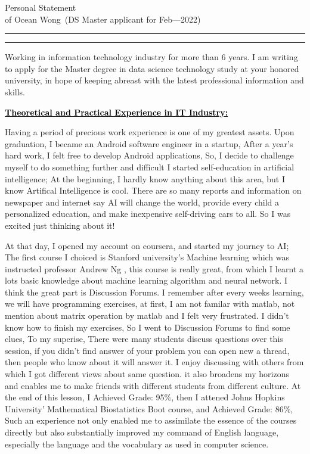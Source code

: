 \documentclass{article}
\newcommand{\soptitle}{Personal Statement}
\newcommand{\yourname}{Ocean Wong}
\newcommand{\statement}[1]{\par\medskip
  \underline{\textcolor{black}{\textbf{#1:}}}\space
}
\begin{document}
\begin{center}\LARGE\soptitle\\
\large of \yourname\ (DS Master applicant for Feb---2022)
\end{center}

\hrule
\vspace{1pt}
\hrule height 1pt

\bigskip

Working in information technology industry for more than 6 years. I am writing to apply for the Master degree in data science technology study at your honored university, in hope of keeping abreast with the latest professional information and skills.

\statement{Theoretical and Practical Experience in IT Industry}
Having a period of precious work experience is one of my greatest assets. Upon graduation, I became an Android software engineer in a startup, After a year's hard work, I felt free to develop Android applications, So, I decide to challenge myself to do something further and difficult
I started self-education in artificial intelligence; At the beginning, I hardly know anything about this area, but I know Artifical Intelligence is cool. There are so many reports and information on newspaper and internet say AI will change the world, provide every child a personalized education, and make inexpensive self-driving cars to all. So I was excited just thinking about it! 

At that day, I opened my account on coursera, and started my journey to AI; The first course I choiced is Stanford university's Machine learning which was instructed professor Andrew Ng , this course is really great, from which I learnt a lots basic knowledge about machine learning algorithm and neural network. I think the great part is Discussion Forums. I remember after every weeks learning, we will have programming exercises, at first, I am not familar with matlab, not mention about matrix operation by matlab and I felt very frustrated. I didn't know how to finish my exercises, So I went to Discussion Forums to find some clues, To my superise, There were many students discuss questions over this session, if you didn't find answer of your problem you can open new a thread, then people who know about it will answer it. I enjoy discussing with others from which I got different views about same question. it also broadens my horizons and enables me to make friends with different students from different culture. At the end of this lesson, I Achieved Grade: 95\%, then I attened Johns Hopkins University' Mathematical Biostatistics Boot course, and Achieved Grade: 86\%, Such an experience not only enabled me to assimilate the essence of the courses directly but also substantially improved my command of English language, especially the language and the vocabulary as used in computer science.
\end{document}
